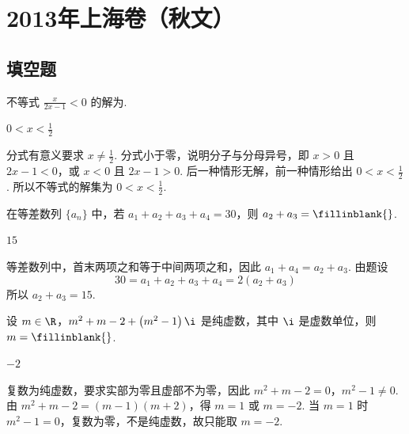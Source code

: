 \chapter{2013年上海卷（秋文）}

\section{填空题}

\begin{problem}
不等式 \(\frac{x}{2x - 1} < 0\) 的解为\fillinblank{}.

\begin{answer}
\(0 < x < \frac{1}{2}\)
\end{answer}

\begin{solution}
分式有意义要求 \(x\ne\frac{1}{2}\). 分式小于零，说明分子与分母异号，即 \(x>0\) 且 \(2x-1<0\)，或 \(x<0\) 且 \(2x-1>0\). 后一种情形无解，前一种情形给出 \(0<x<\frac{1}{2}\). 所以不等式的解集为 \(0<x<\frac{1}{2}\).
\end{solution}
\end{problem}

\begin{problem}
在等差数列 \(\{a_n\}\) 中，若 \(a_1 + a_2 + a_3 + a_4 = 30\)，则 \(a_2 + a_3 =\fillinblank{}\).

\begin{answer}
\(15\)
\end{answer}

\begin{solution}
等差数列中，首末两项之和等于中间两项之和，因此 \(a_1+a_4=a_2+a_3\). 由题设
\[
30=a_1+a_2+a_3+a_4=2(a_2+a_3)
\]
所以 \(a_2+a_3=15\).
\end{solution}
\end{problem}

\begin{problem}
设 \(m \in \R\)，\(m^2 + m - 2 + \left(m^2 - 1\right)\i\) 是纯虚数，其中 \(\i\) 是虚数单位，则 \(m =\fillinblank{}\).

\begin{answer}
\(-2\)
\end{answer}

\begin{solution}
复数为纯虚数，要求实部为零且虚部不为零，因此
\(m^2+m-2=0\)，\(m^2-1\ne0\).
由 \(m^2+m-2=(m-1)(m+2)\)，得 \(m=1\) 或 \(m=-2\). 当 \(m=1\) 时 \(m^2-1=0\)，复数为零，不是纯虚数，故只能取 \(m=-2\).
\end{solution}
\end{problem}

